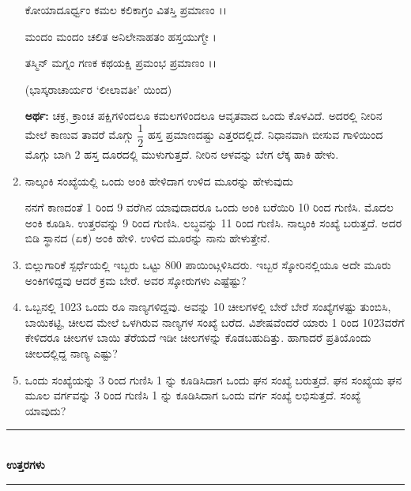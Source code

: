 \begin{enumerate}
ಕೋಯಾದೂರ್ಧ್ವಂ ಕಮಲ ಕಲಿಕಾಗ್ರಂ ವಿತಸ್ತಿ ಪ್ರಮಾಣಂ ।।

ಮಂದಂ ಮಂದಂ ಚಲಿತ ಅನಿಲೇನಾಹತಂ ಹಸ್ತಯುಗ್ಮೇ ।

ತಸ್ಮಿನ್ ಮಗ್ನಂ ಗಣಕ ಕಥಯಕ್ಷಿ ಪ್ರಮಂಭ ಪ್ರಮಾಣಂ ।।

\hfill (ಭಾಸ್ಕರಾಚಾರ್ಯರ `ಲೀಲಾವತೀ' ಯಿಂದ)


{\bf ಅರ್ಥ:} ಚಕ್ರ, ಕ್ರಾಂಚ ಪಕ್ಷಿಗಳಿಂದಲೂ ಕಮಲಗಳಿಂದಲೂ ಆವೃತವಾದ ಒಂದು ಕೊಳವಿದೆ. ಅದರಲ್ಲಿ ನೀರಿನ ಮೇಲೆ ಕಾಣುವ ತಾವರೆ ಮೊಗ್ಗು $\dfrac{1}{2}$ ಹಸ್ತ ಪ್ರಮಾಣದಷ್ಟು ಎತ್ತರದಲ್ಲಿದೆ. ನಿಧಾನವಾಗಿ ಬೀಸುವ ಗಾಳಿಯಿಂದ ಮೊಗ್ಗು ಬಾಗಿ 2 ಹಸ್ತ ದೂರದಲ್ಲಿ ಮುಳುಗುತ್ತದೆ. ನೀರಿನ ಆಳವನ್ನು ಬೇಗ ಲೆಕ್ಕ ಹಾಕಿ ಹೇಳು. 

\item ನಾಲ್ಕಂಕಿ ಸಂಖ್ಯೆಯಲ್ಲಿ ಒಂದು ಅಂಕಿ ಹೇಳಿದಾಗ ಉಳಿದ ಮೂರನ್ನು ಹೇಳುವುದು 

ನನಗೆ ಕಾಣದಂತೆ 1 ರಿಂದ 9 ವರೆಗಿನ ಯಾವುದಾದರೂ ಒಂದು ಅಂಕಿ ಬರೆಯಿರಿ 10 ರಿಂದ ಗುಣಿಸಿ. ಮೊದಲ ಅಂಕಿ ಕೂಡಿಸಿ. ಉತ್ತರವನ್ನು 9 ರಿಂದ ಗುಣಿಸಿ. ಲಬ್ಧವನ್ನು 11 ರಿಂದ ಗುಣಿಸಿ. ನಾಲ್ಕಂಕಿ ಸಂಖ್ಯೆ ಬರುತ್ತದೆ. ಅದರ ಬಿಡಿ ಸ್ಥಾನದ (ಏಕ) ಅಂಕಿ ಹೇಳಿ. ಉಳಿದ ಮೂರನ್ನು ನಾನು ಹೇಳುತ್ತೇನೆ.

\item ಬಿಲ್ಲುಗಾರಿಕೆ ಸ್ಪರ್ಧೆಯಲ್ಲಿ ಇಬ್ಬರು ಒಟ್ಟು 800 ಪಾಯಿಂಟ್ಗಳಿಸಿದರು. ಇಬ್ಬರ ಸ್ಕೋರಿನಲ್ಲಿಯೂ ಅದೇ ಮೂರು ಅಂಕಿಗಳಿದ್ದವು ಆದರೆ ಕ್ರಮ ಬೇರೆ. ಅವರ ಸ್ಕೋರುಗಳು ಎಷ್ಟೆಷ್ಟು? 

\item ಒಬ್ಬನಲ್ಲಿ 1023 ಒಂದು ರೂ ನಾಣ್ಯಗಳಿದ್ದವು. ಅವನ್ನು 10 ಚೀಲಗಳಲ್ಲಿ ಬೇರೆ ಬೇರೆ ಸಂಖ್ಯೆಗಳಷ್ಟು ತುಂಬಿಸಿ, ಬಾಯಿಕಟ್ಟಿ, ಚೀಲದ ಮೇಲೆ ಒಳಗಿರುವ ನಾಣ್ಯಗಳ ಸಂಖ್ಯೆ ಬರೆದ. ವಿಶೇಷವೆಂದರೆ ಯಾರು 1 ರಿಂದ 1023ವರೆಗೆ ಕೇಳಿದರೂ ಚೀಲಗಳ ಬಾಯಿ ತೆರೆಯದೆ ಇಡೀ ಚೀಲಗಳನ್ನು ಕೊಡಬಹುದಿತ್ತು. ಹಾಗಾದರೆ ಪ್ರತಿಯೊಂದು ಚೀಲದಲ್ಲಿದ್ದ ನಾಣ್ಯ ಎಷ್ಟು? 

\item ಒಂದು ಸಂಖ್ಯೆಯನ್ನು 3 ರಿಂದ ಗುಣಿಸಿ 1 ನ್ನು ಕೂಡಿಸಿದಾಗ ಒಂದು ಘನ ಸಂಖ್ಯೆ ಬರುತ್ತದೆ. ಘನ ಸಂಖ್ಯೆಯ ಘನ ಮೂಲ ವರ್ಗವನ್ನು 3 ರಿಂದ ಗುಣಿಸಿ 1 ನ್ನು ಕೂಡಿಸಿದಾಗ ಒಂದು ವರ್ಗ ಸಂಖ್ಯೆ ಲಭಿಸುತ್ತದೆ. ಸಂಖ್ಯೆ ಯಾವುದು?
\end{enumerate}

\smallskip

\begin{center}
\rule{5cm}{1pt}\\[3pt]
{\Large\bfseries ಉತ್ತರಗಳು}\\[-0.1cm]
\rule{5cm}{1pt}
\end{center}

